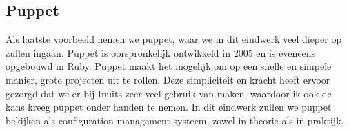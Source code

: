\subsection{Puppet}
Als laatste voorbeeld nemen we puppet, waar we in dit eindwerk veel dieper op zullen ingaan. Puppet is oorspronkelijk ontwikkeld in 2005 en is eveneens opgebouwd in Ruby. Puppet maakt het mogelijk om op een snelle en simpele manier, grote projecten uit te rollen. Deze simpliciteit en kracht heeft ervoor gezorgd dat we er bij Inuits zeer veel gebruik van maken, waardoor ik ook de kans kreeg puppet onder handen te nemen. In dit eindwerk zullen we puppet bekijken als configuration management systeem, zowel in theorie als in praktijk.
